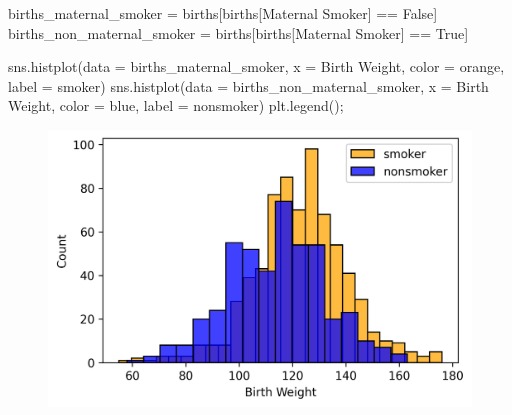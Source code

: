 \documentclass[
  letterpaper,
  DIV=11,
  numbers=noendperiod]{scrreprt}
\newenvironment{Shaded}{\begin{snugshade}}{\end{snugshade}}
\newcommand{\NormalTok}[1]{\textcolor[rgb]{0.00,0.23,0.31}{#1}}
\newcommand{\OperatorTok}[1]{\textcolor[rgb]{0.37,0.37,0.37}{#1}}
\newcommand{\StringTok}[1]{\textcolor[rgb]{0.13,0.47,0.30}{#1}}
\newcommand{\VariableTok}[1]{\textcolor[rgb]{0.07,0.07,0.07}{#1}}
\begin{document}
\begin{Shaded}
\begin{Highlighting}[]
\NormalTok{births\_maternal\_smoker }\OperatorTok{=}\NormalTok{ births[births[}\StringTok{\textquotesingle{}Maternal Smoker\textquotesingle{}}\NormalTok{] }\OperatorTok{==} \VariableTok{False}\NormalTok{]}
\NormalTok{births\_non\_maternal\_smoker }\OperatorTok{=}\NormalTok{ births[births[}\StringTok{\textquotesingle{}Maternal Smoker\textquotesingle{}}\NormalTok{] }\OperatorTok{==} \VariableTok{True}\NormalTok{]}

\NormalTok{sns.histplot(data }\OperatorTok{=}\NormalTok{ births\_maternal\_smoker, x }\OperatorTok{=} \StringTok{\textquotesingle{}Birth Weight\textquotesingle{}}\NormalTok{,}
\NormalTok{             color }\OperatorTok{=} \StringTok{\textquotesingle{}orange\textquotesingle{}}\NormalTok{, label }\OperatorTok{=} \StringTok{\textquotesingle{}smoker\textquotesingle{}}\NormalTok{)}
\NormalTok{sns.histplot(data }\OperatorTok{=}\NormalTok{ births\_non\_maternal\_smoker, x }\OperatorTok{=} \StringTok{\textquotesingle{}Birth Weight\textquotesingle{}}\NormalTok{,}
\NormalTok{             color }\OperatorTok{=} \StringTok{\textquotesingle{}blue\textquotesingle{}}\NormalTok{, label }\OperatorTok{=} \StringTok{\textquotesingle{}nonsmoker\textquotesingle{}}\NormalTok{)}
\NormalTok{plt.legend()}\OperatorTok{;}
\end{Highlighting}
\end{Shaded}

\begin{figure}[H]

{\centering \includegraphics{visualization_1/visualization_1_files/figure-pdf/cell-20-output-1.png}

}

\end{figure}
\end{document}
